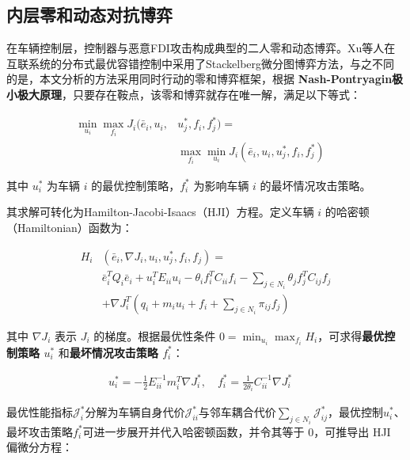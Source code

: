 \documentclass[10.5pt,a4paper,twoside,twocolumn]{ctexart}
\begin{document}
\subsection{\heiti{} 内层零和动态对抗博弈}

在车辆控制层，控制器与恶意FDI攻击构成典型的二人零和动态博弈。Xu等人\cite{xu2022}在互联系统的分布式最优容错控制中采用了Stackelberg微分图博弈方法，与之不同的是，本文分析的方法采用同时行动的零和博弈框架，根据 \textbf{Nash-Pontryagin极小极大原理}，只要存在鞍点，该零和博弈就存在唯一解，满足以下等式：

\begin{equation}
	\begin{aligned}
\min_{u_i} \max_{f_i} J_i(\bar{e}_i, u_i, & u_j^*, f_i, f_j^*) =  \\
& \max_{f_i} \min_{u_i} J_i(\bar{e}_i, u_i, u_j^*, f_i, f_j^*) \quad
\end{aligned}
\end{equation}

其中 $u_i^*$ 为车辆 $i$ 的最优控制策略，$f_i^*$ 为影响车辆 $i$ 的最坏情况攻击策略。



其求解可转化为Hamilton-Jacobi-Isaacs（HJI）方程。定义车辆 $i$ 的哈密顿（Hamiltonian）函数为：


\begin{equation}
\begin{aligned}
	H_i&(\bar{e}_i, \nabla J_i, u_i, u_j^*, f_i, f_j) = \\
	&\bar{e}_i^T Q_i \bar{e}_i + u_i^T E_{ii} u_i - \theta_i f_i^T C_{ii} f_i - \sum_{j \in N_i} \theta_j f_j^T C_{ij} f_j \\
	&+ \nabla J_i^T \left( q_i + m_i u_i + f_i + \sum_{j \in N_i} \pi_{ij} f_j \right)
\end{aligned}
\end{equation}

其中 $\nabla J_i$ 表示 $J_i$ 的梯度。根据最优性条件 $0 = \min_{u_i} \max_{f_i} H_i$，可求得\textbf{最优控制策略 $u_i^*$ }和\textbf{最坏情况攻击策略 $f_i^*$}：

\begin{equation}
	\begin{aligned}
	u_i^* = -\frac{1}{2} E_{ii}^{-1} m_i^T \nabla J_i^*, \quad f_i^* = \frac{1}{2\theta_i} C_{ii}^{-1} \nabla J_i^* \quad	
	\end{aligned}
\end{equation}

最优性能指标$\mathcal{J}_i^*$分解为车辆自身代价$\mathcal{J}_{ii}^*$与邻车耦合代价$\sum_{j\in N_i}\mathcal{J}_{ij}^*$，最优控制$u_i^*$、最坏攻击策略$f_i^*$可进一步展开并代入哈密顿函数，并令其等于 0，可推导出 HJI 偏微分方程：
\end{document}
